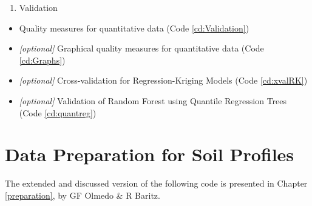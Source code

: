 \documentclass[10pt,b5paper,]{book}
\providecommand{\tightlist}{%
  \setlength{\itemsep}{0pt}\setlength{\parskip}{0pt}}
\theoremstyle{definition}
\theoremstyle{definition}
\theoremstyle{definition}
\theoremstyle{remark}
\begin{document}
\begin{enumerate}
\def\labelenumi{\arabic{enumi}.}
\setcounter{enumi}{3}
\tightlist
\item
  Validation
\end{enumerate}

\begin{itemize}
\tightlist
\item
  Quality measures for quantitative data (Code \ref{cd:Validation})
\item
  \emph{{[}optional{]}} Graphical quality measures for quantitative data
  (Code \ref{cd:Graphs})
\item
  \emph{{[}optional{]}} Cross-validation for Regression-Kriging Models
  (Code \ref{cd:xvalRK})
\item
  \emph{{[}optional{]}} Validation of Random Forest using Quantile
  Regression Trees (Code \ref{cd:quantreg})
\end{itemize}

\clearpage

\hypertarget{cd:PreparationProfiles}{%
\section{Data Preparation for Soil
Profiles}\label{cd:PreparationProfiles}}

The extended and discussed version of the following code is presented in
Chapter \ref{preparation}, by GF Olmedo \& R Baritz.
\end{document}

